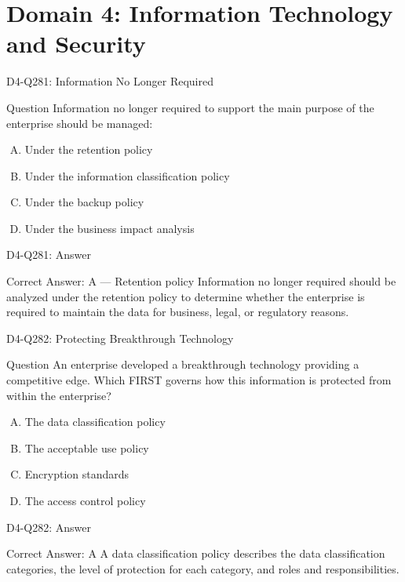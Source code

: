 \documentclass{beamer}
\begin{document}
	\section{Domain 4: Information Technology and Security}
	
	\begin{frame}{D4-Q281: Information No Longer Required}
		\begin{block}{Question}
			Information no longer required to support the main purpose of the enterprise should be managed:
		\end{block}
		\begin{enumerate}[(A)]
			\item Under the retention policy
			\item Under the information classification policy
			\item Under the backup policy
			\item Under the business impact analysis
		\end{enumerate}
	\end{frame}
	\begin{frame}{D4-Q281: Answer}
		\begin{block}{Correct Answer: A --- Retention policy}
			Information no longer required should be analyzed under the retention policy to determine whether the enterprise is required to maintain the data for business, legal, or regulatory reasons.
		\end{block}
	\end{frame}
	
	\begin{frame}{D4-Q282: Protecting Breakthrough Technology}
		\begin{block}{Question}
			An enterprise developed a breakthrough technology providing a competitive edge. Which FIRST governs how this information is protected from within the enterprise?
		\end{block}
		\begin{enumerate}[(A)]
			\item The data classification policy
			\item The acceptable use policy
			\item Encryption standards
			\item The access control policy
		\end{enumerate}
	\end{frame}
	\begin{frame}{D4-Q282: Answer}
		\begin{block}{Correct Answer: A}
			A data classification policy describes the data classification categories, the level of protection for each category, and roles and responsibilities.
		\end{block}
	\end{frame}
	
\end{document}
